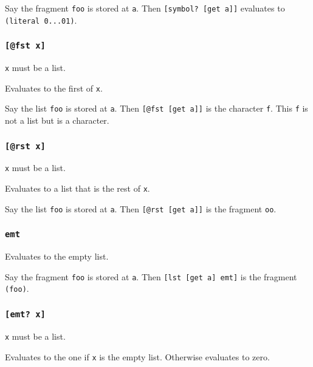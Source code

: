 \documentclass[]{article}
\begin{document}
Say the fragment \texttt{foo} is stored at \texttt{a}. Then
\texttt{{[}symbol?\ {[}get\ a{]}{]}} evaluates to
\texttt{(literal\ 0...01)}.

\hypertarget{ux7bux5bux7dux40fst-xux7bux5dux7d}{%
\subsubsection{\texorpdfstring{\texttt{{[}@fst\ x{]}}}{{[}@fst x{]}}}\label{ux7bux5bux7dux40fst-xux7bux5dux7d}}

\texttt{x} must be a list.

Evaluates to the first of \texttt{x}.

Say the list \texttt{foo} is stored at \texttt{a}. Then
\texttt{{[}@fst\ {[}get\ a{]}{]}} is the character \texttt{f}. This
\texttt{f} is not a list but is a character.

\hypertarget{ux7bux5bux7dux40rst-xux7bux5dux7d}{%
\subsubsection{\texorpdfstring{\texttt{{[}@rst\ x{]}}}{{[}@rst x{]}}}\label{ux7bux5bux7dux40rst-xux7bux5dux7d}}

\texttt{x} must be a list.

Evaluates to a list that is the rest of \texttt{x}.

Say the list \texttt{foo} is stored at \texttt{a}. Then
\texttt{{[}@rst\ {[}get\ a{]}{]}} is the fragment \texttt{oo}.

\hypertarget{emt}{%
\subsubsection{\texorpdfstring{\texttt{emt}}{emt}}\label{emt}}

Evaluates to the empty list.

Say the fragment \texttt{foo} is stored at \texttt{a}. Then
\texttt{{[}lst\ {[}get\ a{]}\ emt{]}} is the fragment \texttt{(foo)}.

\hypertarget{ux7bux5bux7demtux3f-xux7bux5dux7d}{%
\subsubsection{\texorpdfstring{\texttt{{[}emt?\ x{]}}}{{[}emt? x{]}}}\label{ux7bux5bux7demtux3f-xux7bux5dux7d}}

\texttt{x} must be a list.

Evaluates to the one if \texttt{x} is the empty list. Otherwise
evaluates to zero.
\end{document}
